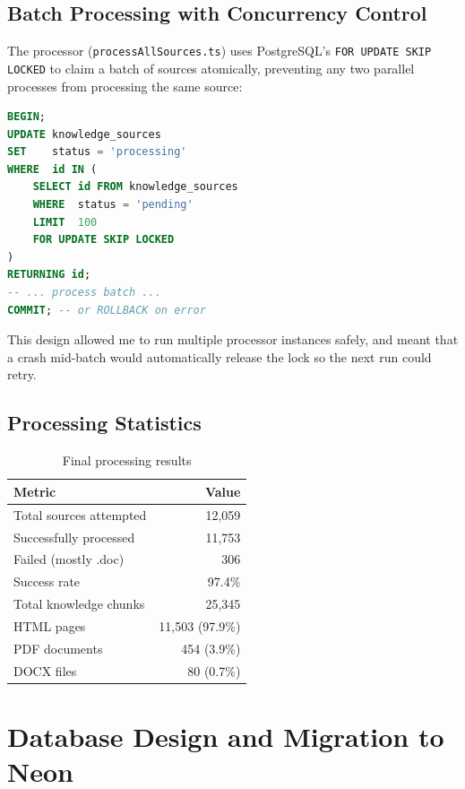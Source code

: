 \documentclass[12pt,a4paper]{report}
\begin{document}
\section{Batch Processing with Concurrency Control}

The processor (\texttt{processAllSources.ts}) uses PostgreSQL's \texttt{FOR UPDATE SKIP LOCKED} to claim a batch of sources atomically, preventing any two parallel processes from processing the same source:

\begin{lstlisting}[language=sql, caption=Atomic batch claim preventing race conditions]
BEGIN;
UPDATE knowledge_sources
SET    status = 'processing'
WHERE  id IN (
    SELECT id FROM knowledge_sources
    WHERE  status = 'pending'
    LIMIT  100
    FOR UPDATE SKIP LOCKED
)
RETURNING id;
-- ... process batch ...
COMMIT; -- or ROLLBACK on error
\end{lstlisting}

This design allowed me to run multiple processor instances safely, and meant that a crash mid-batch would automatically release the lock so the next run could retry.

\section{Processing Statistics}

\begin{table}[H]
\centering
\caption{Final processing results}
\begin{tabular}{lr}
\toprule
\textbf{Metric} & \textbf{Value} \\
\midrule
Total sources attempted    & 12,059 \\
Successfully processed     & 11,753 \\
Failed (mostly .doc)       & 306 \\
Success rate               & 97.4\% \\
Total knowledge chunks     & 25,345 \\
\midrule
HTML pages                 & 11,503 (97.9\%) \\
PDF documents              & 454 (3.9\%) \\
DOCX files                 & 80 (0.7\%) \\
\bottomrule
\end{tabular}
\end{table}

\chapter{Database Design and Migration to Neon}
\end{document}
